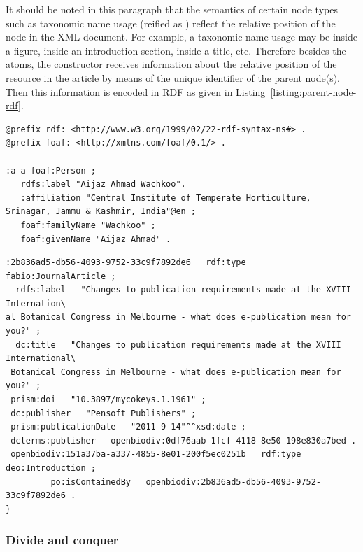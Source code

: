 It should be noted in this paragraph that the semantics of certain node types such as taxonomic name usage (reified as ) reflect the relative position of the node in the XML document. For example, a taxonomic name usage may be inside a figure, inside an introduction section, inside a title, etc. Therefore besides the atoms, the constructor receives information about the relative position of the resource in the article by means of the unique identifier of the parent node(s). Then this information is encoded in RDF as given in Listing~\ref{listing:parent-node-rdf}. 

\begin{lstlisting}[language=SPARQL,
caption=RDF snippet of an author. This is a somewhat idealized situation in which the language of the address was available from the article., label=listing:author_rdf, basicstyle=\ttfamily\tiny]
@prefix rdf: <http://www.w3.org/1999/02/22-rdf-syntax-ns#> .
@prefix foaf: <http://xmlns.com/foaf/0.1/> .

:a a foaf:Person ;
   rdfs:label "Aijaz Ahmad Wachkoo".
   :affiliation "Central Institute of Temperate Horticulture, Srinagar, Jammu & Kashmir, India"@en ;
   foaf:familyName "Wachkoo" ;
   foaf:givenName "Aijaz Ahmad" .
\end{lstlisting}

\begin{lstlisting}[language=SPARQL,
caption=., label=listing:parent-node-rdf, basicstyle=\ttfamily\tiny]
:2b836ad5-db56-4093-9752-33c9f7892de6   rdf:type   fabio:JournalArticle ;
  rdfs:label   "Changes to publication requirements made at the XVIII Internation\
al Botanical Congress in Melbourne - what does e-publication mean for you?" ;
  dc:title   "Changes to publication requirements made at the XVIII International\
 Botanical Congress in Melbourne - what does e-publication mean for you?" ;
 prism:doi   "10.3897/mycokeys.1.1961" ;
 dc:publisher   "Pensoft Publishers" ;
 prism:publicationDate   "2011-9-14"^^xsd:date ;
 dcterms:publisher   openbiodiv:0df76aab-1fcf-4118-8e50-198e830a7bed .
 openbiodiv:151a37ba-a337-4855-8e01-200f5ec0251b   rdf:type   deo:Introduction ;
         po:isContainedBy   openbiodiv:2b836ad5-db56-4093-9752-33c9f7892de6 .
}
\end{lstlisting}

\subsubsection{Divide and conquer}

